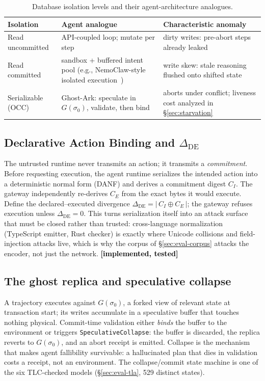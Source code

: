 \documentclass[10pt,twocolumn,letterpaper]{article}
\newcommand{\scstates}{529}
\newcommand{\ghostark}{Ghost-Ark}
\newcommand{\statusimpl}[0]{\textcolor{black}{\textbf{[implemented, tested]}}}
\begin{document}
\begin{table}[t]
\centering\small
\begin{tabular}{@{}p{2.0cm}p{2.4cm}p{2.6cm}@{}}
\toprule
\textbf{Isolation} & \textbf{Agent analogue} & \textbf{Characteristic anomaly}\\
\midrule
Read uncommitted & API-coupled loop; mutate per step & dirty writes: pre-abort
steps already leaked \\
Read committed & sandbox + buffered intent pool (e.g., NemoClaw-style
isolated execution~\cite{nemoclaw2026}) & write skew: stale reasoning
flushed onto shifted state \\
Serializable (OCC) & \ghostark{}: speculate in $G(\sigma_0)$, validate, then
bind & aborts under conflict; liveness cost analyzed in \S\ref{sec:starvation} \\
\bottomrule
\end{tabular}
\caption{Database isolation levels and their agent-architecture analogues.}
\label{tab:isolation}
\end{table}

\subsection{Declarative Action Binding and $\Delta_{\mathrm{DE}}$}
\label{sec:dab}

The untrusted runtime never transmits an action; it transmits a
\emph{commitment}. Before requesting execution, the agent runtime serializes
the intended action into a deterministic normal form (DANF) and derives a
commitment digest $C_I$. The gateway independently re-derives $C_E$ from the
exact bytes it would execute. Define the declared--executed divergence
$\Delta_{\mathrm{DE}} = |\,C_I \oplus C_E\,|$; the gateway refuses execution
unless $\Delta_{\mathrm{DE}} = 0$. This turns serialization itself into an
attack surface that must be closed rather than trusted: cross-language
normalization (TypeScript emitter, Rust checker) is exactly where Unicode
collisions and field-injection attacks live, which is why the corpus of
\S\ref{sec:eval-corpus} attacks the encoder, not just the network.
\statusimpl{}

\subsection{The ghost replica and speculative collapse}
\label{sec:ghost}

A trajectory executes against $G(\sigma_0)$, a forked view of relevant state
at transaction start; its writes accumulate in a speculative buffer that
touches nothing physical. Commit-time validation either \emph{binds} the
buffer to the environment or triggers \texttt{SpeculativeCollapse}: the
buffer is discarded, the replica reverts to $G(\sigma_0)$, and an abort
receipt is emitted. Collapse is the mechanism that makes agent fallibility
survivable: a hallucinated plan that dies in validation costs a receipt, not
an environment. The collapse/commit state machine is one of the six
TLC-checked models (\S\ref{sec:eval-tla}, \scstates{} distinct states).
\end{document}
